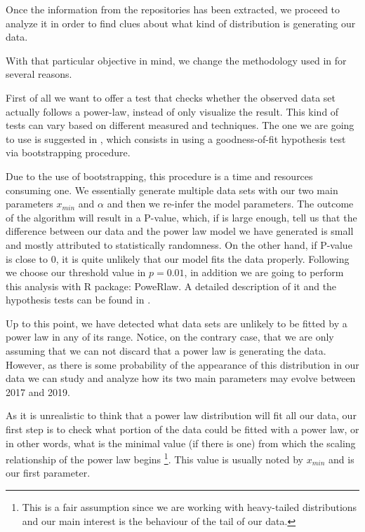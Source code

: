\documentclass[conference]{IEEEtran}
\begin{document}
Once the information from the repositories has been extracted, we
proceed to analyze it in order to find clues about what kind of distribution is generating our data. 

With that particular objective in mind, we change the methodology used
in \cite{merelo2017self} for several reasons.

First of all we want to offer a test that checks whether the observed data 
set actually follows a power-law, instead of only visualize the result. 
This kind of tests can vary based on different measured and techniques. The one we
are going to use is suggested in \cite{clauset2009power}, which consists in using a
goodness-of-fit hypothesis test via bootstrapping procedure. 

Due to the use of bootstrapping, this procedure is a time and resources consuming one.
We essentially  generate  multiple  data  sets  with our two main parameters $x_{min}$ 
and $\alpha$  and  then  we re-infer the model parameters. The outcome of the algorithm 
will result in a P-value, which, if is large enough, tell us that the difference
between our data and the power law model we have generated is small and mostly attributed
to statistically randomness. On the other hand, if P-value is close to 0, it is quite unlikely
that our model fits the data properly.
Following \cite{clauset2009power} we choose our threshold value in $p=0.01$, in addition
we are going to perform this analysis with R package: PoweRlaw. A detailed description
of it and the hypothesis tests can be found in \cite{gillespie2015power}.

Up to this point, we have detected what data sets are unlikely to be fitted by a power law
in any of its range. Notice, on the contrary case, that we are only assuming that
we can not discard that a power law is generating the data.
However, as there is some probability of the appearance of this distribution in our data
we can study and analyze how its two main parameters may evolve between 2017 and 2019.

As it is unrealistic to think that a power law distribution will
fit all our data, our first step is to check what portion of the data
could be fitted with a power law, or in other words, what is the minimal value 
(if there is one) from which the scaling relationship of the power law begins
\footnote{This is a fair assumption since we are working with heavy-tailed distributions 
	and our main interest is the behaviour of the tail of our data.}. 
This value is usually noted by $x_{min}$ and is our first parameter.
\end{document}
